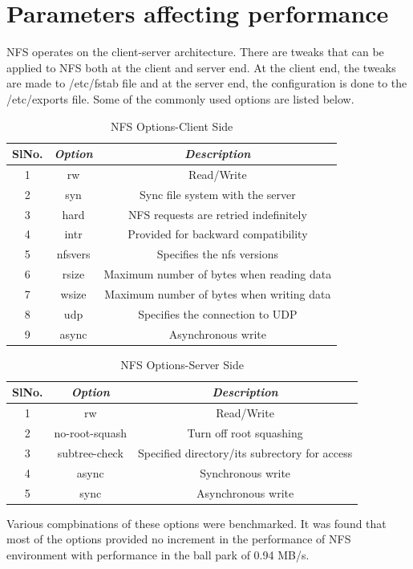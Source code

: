 \documentclass[conference]{IEEEtran}
\begin{document}
\section{Parameters affecting performance}
NFS operates on the client-server architecture. There are tweaks that can
be applied to NFS both at the client and server end. At the client end, the
tweaks are made to /etc/fstab file and at the server end, the configuration
is done to the /etc/exports file. Some of the commonly used options are
listed below.
\begin{table}[htbp]
\caption{NFS Options-Client Side}
\begin{center}
\begin{tabular}{|c|c|c|}
\hline
\cline{2-3} 
\textbf{SlNo.} & \textbf{\textit{Option}}& \textbf{\textit{Description}} \\
\hline
1& rw & Read/Write  \\
2& syn & Sync file system with the server  \\
3& hard & NFS requests are retried indefinitely  \\
4& intr & Provided for backward compatibility \\
5& nfsvers & Specifies the nfs versions  \\
6& rsize & Maximum number of bytes when reading data  \\
7& wsize & Maximum number of bytes when writing data  \\
8& udp & Specifies the connection to UDP  \\
9& async & Asynchronous write  \\
\hline
\end{tabular}
\label{tab2}
\end{center}
\end{table}
\begin{table}[htbp]
\caption{NFS Options-Server Side}
\begin{center}
\begin{tabular}{|c|c|c|}
\hline
\cline{2-3} 
\textbf{SlNo.} & \textbf{\textit{Option}}& \textbf{\textit{Description}} \\
\hline
1& rw & Read/Write  \\
2& no-root-squash & Turn off root squashing  \\
3& subtree-check & Specified directory/its subrectory for access  \\
4& async & Synchronous write \\
5& sync & Asynchronous write  \\
\hline
\end{tabular}
\label{tab1}
\end{center}
\end{table}
Various compbinations of these options were benchmarked. It was found that
most of the options provided no increment in the performance of NFS
environment with performance in the ball park of 0.94 MB/s.
\end{document}
